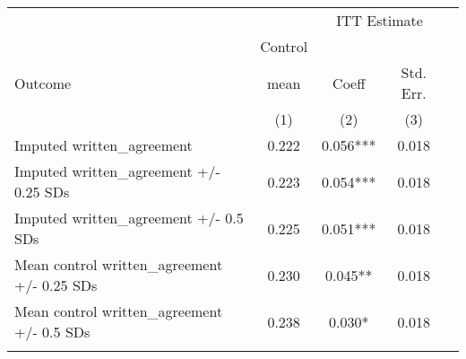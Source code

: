\begin{tabular}{lcccc}
\hline \noalign{\smallskip} &  & \multicolumn{2}{c}{{ ITT Estimate}} & \\
\cline{3-4} & Control &  &  & \\
Outcome & mean & Coeff & Std. Err. & \\
 & (1) & (2) & (3) & \\
\noalign{\smallskip}\hline \noalign{\smallskip}Imputed written\_agreement & 0.222 & 0.056*** & 0.018 & \\
Imputed written\_agreement +/- 0.25 SDs & 0.223 & 0.054*** & 0.018 & \\
Imputed written\_agreement +/- 0.5 SDs & 0.225 & 0.051*** & 0.018 & \\
Mean control written\_agreement +/- 0.25 SDs & 0.230 & 0.045** & 0.018 & \\
Mean control written\_agreement +/- 0.5 SDs & 0.238 & 0.030* & 0.018 & \\
\noalign{\smallskip}\hline\end{tabular}\\
